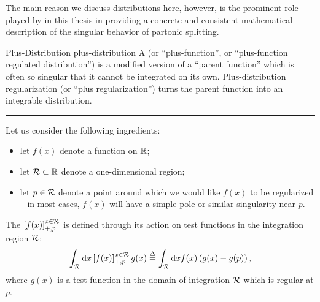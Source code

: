 \begin{subappendices}
The main reason we discuss distributions here, however, is the prominent role played by  in this thesis in providing a concrete and consistent mathematical description of the singular behavior of partonic splitting.

\begin{definitionbox}{
Plus-Distribution
}{plus-distribution}
    A  (or ``plus-function'', or ``plus-function regulated distribution'') is a modified version of a ``parent function'' which is often so singular that it cannot be integrated on its own.
    Plus-distribution regularization (or ``plus regularization'') turns the parent function into an integrable distribution.

    \vspace{7pt}
    \hrule
    \vspace{7pt}

    Let us consider the following ingredients:
    \begin{itemize}
        \item
            let \(f(x)\) denote a function on \(\mathbb R\);
        \item
            let \(\mathcal{R} \subset \mathbb R\) denote a one-dimensional region;

        \item
            let \(p \in \mathcal{R}\) denote a point around which we would like \(f(x)\) to be regularized -- in most cases, \(f(x)\) will have a simple pole or similar singularity near \(p\).
    \end{itemize}

    The  \(\left[f(x)\right]_{+,p}^{x \in \mathcal{R}}\) is defined through its action on test functions in the integration region \(\mathcal{R}\):
    \begin{equation}
        \int_{\mathcal{R}} \dd x\left[f(x)\right]_{+,p}^{x \in \mathcal{R}} g(x) \overset{\Delta}{=} \int_{\mathcal{R}} \dd x f(x) \left(g(x) - g(p)\right)
        ,
    \end{equation}
    where \(g(x)\) is a test function in the domain of integration \(\mathcal{R}\) which is regular at \(p\).
\end{definitionbox}



\end{subappendices}
